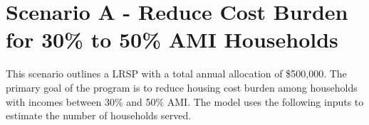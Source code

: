 \documentclass[
  10pt,
  letterpaper,
  DIV=11,
  numbers=noendperiod]{scrartcl}
\begin{document}
\begin{table}[H]

\caption{\label{tbl-fmrs}ARHA 2023 Payment Standards}


\end{table}%

\newpage

\section{Scenario A - Reduce Cost Burden for 30\% to 50\% AMI
Households}\label{scenario-a---reduce-cost-burden-for-30-to-50-ami-households}

This scenario outlines a LRSP with a total annual allocation of
\$500,000. The primary goal of the program is to reduce housing cost
burden among households with incomes between 30\% and 50\% AMI. The
model uses the following inputs to estimate the number of households
served.
\end{document}
